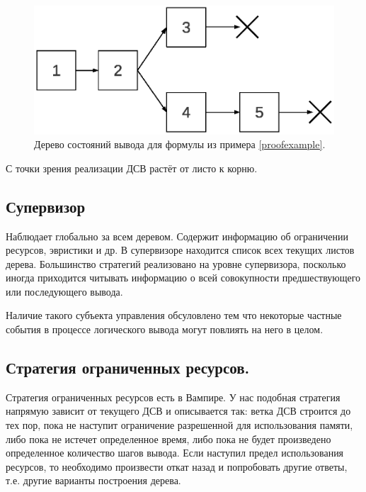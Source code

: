 \begin{figure}[h]
	\centering
	\includegraphics[width=0.4\linewidth]{pics/PST.eps}
	\caption{Дерево состояний вывода для формулы из примера \ref{proofexample}.}
	\label{fig:pst}
\end{figure}

С точки зрения реализации ДСВ растёт от листо к корню.


\subsection{Супервизор}
Наблюдает глобально за всем деревом. Содержит информацию об ограничении ресурсов, эвристики и др.
В супервизоре находится список всех текущих листов дерева.
Большинство стратегий реализовано на уровне супервизора, посколько иногда приходится читывать информацию о всей совокупности предшествующего или последующего вывода.

Наличие такого субъекта управления обсуловлено тем что некоторые частные события в процессе логического вывода могут повлиять на него в целом.

\subsection{Стратегия ограниченных ресурсов.}
Стратегия ограниченных ресурсов есть в Вампире. У нас подобная стратегия напрямую зависит от текущего ДСВ и описывается так: ветка ДСВ строится до тех пор, пока не наступит ограничение разрешенной для использования памяти, либо пока не истечет определенное время, либо пока не будет произведено определенное количество шагов вывода. Если наступил предел использования ресурсов, то необходимо произвести откат назад и попробовать другие ответы, т.е. другие варианты построения дерева.


